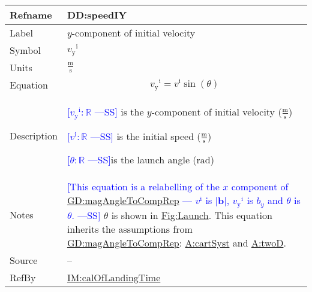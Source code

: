 \documentclass[12pt]{article}
\newcommand{\authornote}[3]{\textcolor{#1}{[#3 ---#2]}}
\newcommand{\authornote}[3]{}
\newcommand{\wss}[1]{\authornote{blue}{SS}{#1}}
\begin{document}
\medskip
\noindent
\begin{minipage}{\textwidth}
\begin{tabular}{>{\raggedright}p{}>{\raggedright\arraybackslash}p{}}
\toprule \textbf{Refname} & \textbf{DD:speedIY}
\label{DD:speedIY}
\\ \midrule
Label & $y$-component of initial velocity
        
\\ \midrule
Symbol & ${{v_{\text{y}}}^{\text{i}}}$
         
\\ \midrule
Units & $\frac{\text{m}}{\text{s}}$
        
\\ \midrule
Equation & \begin{displaymath}
           {{v_{\text{y}}}^{\text{i}}}={v^{\text{i}}} \sin\left(θ\right)
           \end{displaymath}
\\ \midrule
Description & \begin{symbDescription}
              \item{\wss{${{v_{\text{y}}}^{\text{i}}}: \mathbb{R}$} is the $y$-component of initial velocity ($\frac{\text{m}}{\text{s}}$)}
              \item{\wss{${v^{\text{i}}}: \mathbb{R}$} is the initial speed ($\frac{\text{m}}{\text{s}}$)}
              \item{\wss{$θ: \mathbb{R}$}is the launch angle (${\text{rad}}$)}
              \end{symbDescription}
\\ \midrule
Notes & \wss{This equation is a relabelling of the $x$ component of
\hyperref[GD:magAngleToCompRep]{GD:magAngleToCompRep} --- ${v^{\text{i}}}$ is
$|\symbf{b}|$, ${v_{\text{y}}}^{\text{i}}$ is $b_y$ and $\theta$ is $\theta$.}
$θ$ is shown in \hyperref[Figure:Launch]{Fig:Launch}.   This equation inherits
the assumptions from \hyperref[GD:magAngleToCompRep]{GD:magAngleToCompRep}:
\hyperref[cartSyst]{A:cartSyst} and \hyperref[twoD]{A:twoD}.
        
\\ \midrule
Source & --
         
\\ \midrule
RefBy & \hyperref[IM:calOfLandingTime]{IM:calOfLandingTime}
        
\\ \bottomrule
\end{tabular}
\end{minipage}
~\\
\end{document}
